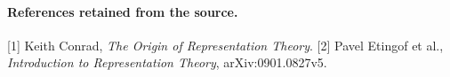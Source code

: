 \paragraph{References retained from the source.}
[1] Keith Conrad, \emph{The Origin of Representation Theory}.
[2] Pavel Etingof et al., \emph{Introduction to Representation Theory}, arXiv:0901.0827v5.
